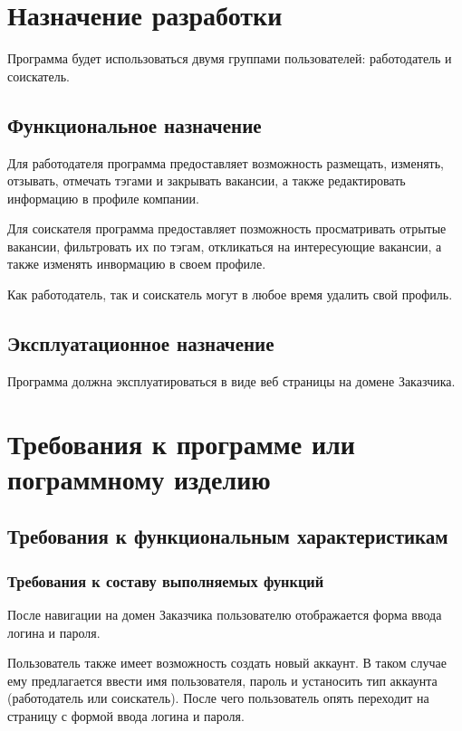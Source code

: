 \documentclass[a4page]{article}
\begin{document}
\section{Назначение разработки}

Программа будет использоваться двумя группами пользователей: работодатель и соискатель.

\subsection{Функциональное назначение}

Для работодателя программа предоставляет возможность размещать, изменять, отзывать, отмечать тэгами и закрывать вакансии, а также редактировать информацию в профиле компании.

Для соискателя программа предоставляет позможность просматривать отрытые вакансии, фильтровать их по тэгам, откликаться на интересующие вакансии, а также изменять инвормацию в своем профиле.

Как работодатель, так и соискатель могут в любое время удалить свой профиль.

\subsection{Эксплуатационное назначение}

Программа должна эксплуатироваться в виде веб страницы на домене Заказчика.

\section{Требования к программе или пограммному изделию}

\subsection{Требования к функциональным характеристикам}

\subsubsection{Требования к составу выполняемых функций}

После навигации на домен Заказчика пользователю отображается форма ввода логина и пароля.

Пользователь также имеет возможность создать новый аккаунт. В таком случае ему предлагается ввести имя пользователя, пароль и устаносить тип аккаунта (работодатель или соискатель). После чего пользователь опять переходит на страницу с формой ввода логина и пароля.
\end{document}

